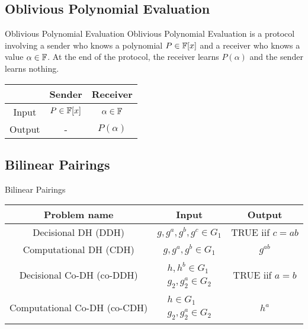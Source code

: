 \subsection{Oblivious Polynomial Evaluation}
\begin{frame}{Oblivious Polynomial Evaluation}
Oblivious Polynomial Evaluation is a protocol involving a sender who knows a polynomial $P \in {\mathbb F}[x]$ and a receiver who knows a value $\alpha \in {\mathbb F}$. At the end of the protocol, the receiver learns $P(\alpha)$ and the sender learns nothing.


\begin{center}
\begin{tabular}{|c|c|c|}
\hline
             &    Sender & Receiver \\ \hline
    Input    &    $P \in {\mathbb F}[x]$ & $\alpha \in {\mathbb F}$ \\ \hline
    Output   &    -    &    $P(\alpha)$ \\ \hline

\end{tabular}
\end{center}

\end{frame}

\subsection{Bilinear Pairings}
\begin{frame}{Bilinear Pairings}

\begin{center}
\small
\begin{tabular}{|c|c|c|}
\hline
Problem name & Input & Output \\
\hline
Decisional DH (DDH) & $g,g^a,g^b,g^c \in G_1$ & TRUE iif $c=ab$ \\ \hline
Computational DH (CDH) & $g,g^a,g^b \in G_1$ &  $g^{ab}$  \\ \hline
Decisional Co-DH (co-DDH) & 
        $\begin{array}{r}
        h,h^b \in G_1 \\ 
        g_2, g_2^a \in G_2
        \end{array}$ & TRUE iif $a=b$ \\ \hline
Computational Co-DH (co-CDH) & 
        $\begin{array}{r}
        h \in G_1 \\
        g_2, g_2^a \in G_2
        \end{array}$ & $h^a$ \\ \hline

\end{tabular}
\end{center}
\end{frame}

